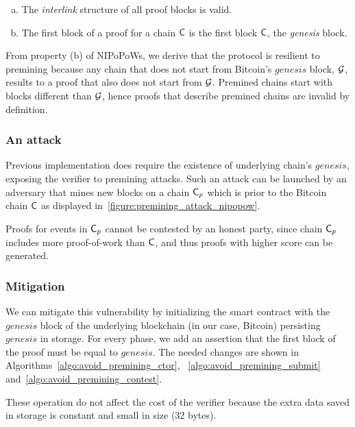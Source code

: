 \begin{enumerate}[(a)]

\item The \emph{interlink} structure of all proof blocks is valid.

\item The first block of a proof for a chain $\mathsf{C}$ is the first block
    $\mathsf{C}$, the \emph{genesis} block.

\end{enumerate}

From property (b) of NIPoPoWs, we derive that the protocol is resilient to
premining because any chain that does not start from Bitcoin's $genesis$ block,
$\mathcal{G}$, results to a proof that also does not start from $\mathcal{G}$. Premined
chains start with blocks different than $\mathcal{G}$, hence proofs that describe
premined chains are invalid by definition.

\subsubsection{An attack} Previous implementation does require the existence of
underlying chain's $genesis$, exposing the verifier to premining attacks. Such
an attack can be launched by an adversary that mines new blocks on a chain
$\mathsf{C}_p$ which is prior to the Bitcoin chain $\mathsf{C}$ as displayed
in~\ref{figure:premining_attack_nipopow}.


Proofs for events in $\mathsf{C}_p$ cannot be contested by an honest party, since
chain $\mathsf{C}_p$ includes more proof-of-work than $\mathsf{C}$, and thus proofs
with higher score can be generated.

\subsubsection{Mitigation}

We can mitigate this vulnerability by initializing the smart contract with the
$genesis$ block of the underlying blockchain (in our case, Bitcoin) persisting
$genesis$ in storage. For every phase, we add an assertion that the first block
of the proof must be equal to $genesis$. The needed changes are shown in
Algorithms~\ref{algo:avoid_premining_ctor}, ~\ref{algo:avoid_premining_submit}
and~\ref{algo:avoid_premining_contest}.

These operation do not affect the cost of the verifier because the extra data
saved in storage is constant and small in size (32 bytes).

